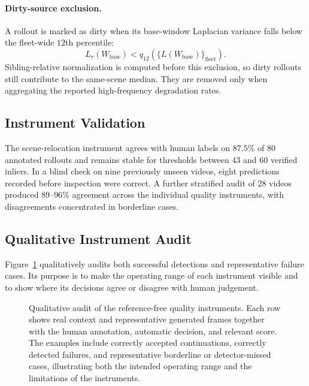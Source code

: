 \documentclass[letterpaper]{article} %
\begin{document}
\paragraph{Dirty-source exclusion.}

A rollout is marked as dirty when its base-window Laplacian variance falls
below the fleet-wide $12$th percentile:
\[
L_r(W_{\mathrm{base}})
<
q_{12}
\left(
\{L(W_{\mathrm{base}})\}_{\mathrm{fleet}}
\right).
\]
Sibling-relative normalization is computed before this exclusion, so dirty
rollouts still contribute to the same-scene median. They are removed only
when aggregating the reported high-frequency degradation rates.


\subsection{Instrument Validation}
\label{app:quality_validation}

The scene-relocation instrument agrees with human labels on $87.5\%$ of
$80$ annotated rollouts and remains stable for thresholds between $43$ and
$60$ verified inliers. In a blind check on nine previously unseen videos,
eight predictions recorded before inspection were correct. A further
stratified audit of $28$ videos produced $89$--$96\%$ agreement across the
individual quality instruments, with disagreements concentrated in
borderline cases.


\subsection{Qualitative Instrument Audit}
\label{app:quality_qualitative_audit}

Figure~\ref{fig:quality_metric_audit} qualitatively audits both successful
detections and representative failure cases. Its purpose is to make the
operating range of each instrument visible and to show where its decisions
agree or disagree with human judgement.

\begin{figure}[t]
\centering
{}
\caption{
    Qualitative audit of the reference-free quality instruments. Each row
    shows real context and representative generated frames together with the
    human annotation, automatic decision, and relevant score. The examples
    include correctly accepted continuations, correctly detected failures,
    and representative borderline or detector-missed cases, illustrating
    both the intended operating range and the limitations of the instruments.
}
\label{fig:quality_metric_audit}
\end{figure}
\end{document}
